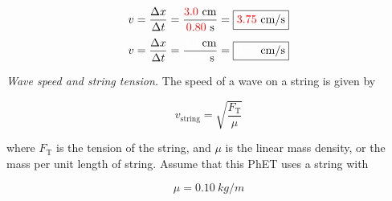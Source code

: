 \documentclass[]{exam}
\begin{document}
\begin{questions}
\begin{parts}
\begin{center}
\begin{minipage}{5cm}
\centering
{}
\end{minipage}%
\hspace{5mm}
\begin{minipage}{7cm}
\centering
{
\large 
\ifprintanswers
\begin{equation*}
    v = \frac{\Delta x}{\Delta t} = \frac{\textcolor{red}{3.0}\ \mathrm{cm}}{\textcolor{red}{0.80}\ \mathrm{s}} = \boxed{\textcolor{red}{3.75}\ \mathrm{cm/s}}
\end{equation*}
\else
\begin{equation*}
    v = \frac{\Delta x}{\Delta t} = \frac{\textcolor{white}{3.0}\ \mathrm{cm}}{\textcolor{white}{0.80}\ \mathrm{s}} = \boxed{\textcolor{white}{3.75}\ \mathrm{cm/s}}
\end{equation*}
\fi
}
\end{minipage}
\end{center}








\end{parts}


\question
\textit{Wave speed and string tension.} The speed of a wave on a string is given by

\begin{equation*}
    v_\mathrm{string} = \sqrt{\frac{F_\mathrm{T}}{\mu}}
\end{equation*}

where $F_\mathrm{T}$ is the tension  of the string, and $\mu$ is the linear mass density, or the mass per unit length of string. Assume that this PhET uses a string with

\begin{equation*}
    \mu = \SI{0.10}{kg/m}
\end{equation*}



\end{questions}
\end{document}
